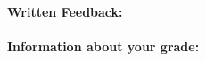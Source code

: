 \documentclass[letterpaper,11pt]{../resources/texMemo}
\begin{document}
\maketitle

\paragraph{Written Feedback:}





\paragraph{Information about your grade:}
\begin{description}
\item





\end{description}
\end{document}
